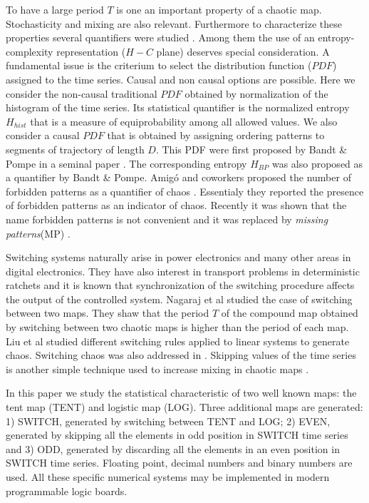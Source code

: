 To have a large period $T$ is one an important property of a chaotic map. Stochasticity and mixing are also relevant. Furthermore to characterize these properties several quantifiers were
studied  \cite{DeMicco2009}. Among them the use of an
entropy-complexity representation ($H-C$ plane) deserves special
consideration\cite{Rosso2007C,DeMicco2008,DeMicco2011,DeMicco2009,Rosso2009}. 
A fundamental issue is the criterium to select the distribution function ($PDF$) assigned to the time series. Causal and non causal options are possible. Here we consider the non-causal traditional $PDF$ obtained by normalization of the histogram of the time series. Its statistical quantifier is the normalized entropy$H_{hist}$ that is  a measure of equiprobability among all allowed values. We also consider a causal $PDF$  that is obtained by assigning ordering patterns to segments of trajectory of length $D$. This PDF were first proposed by Bandt \& Pompe in a seminal paper \cite{Pompe2002}. The corresponding entropy $H_{BP}$ was also proposed as a quantifier by Bandt \& Pompe. Amig\'o and coworkers proposed the number of forbidden patterns as a quantifier of chaos \cite{Amigo2007b}. Essentialy they reported the presence of forbidden patterns as an indicator of chaos. Recently it was shown that the name forbidden patterns is not convenient and it was replaced by  \emph{missing patterns}(MP) \cite{Rosso2012b}. 

Switching systems naturally arise in power electronics and many other areas in digital electronics. They have also interest in transport problems in deterministic ratchets \cite{Zarlenga2009} and it is known that synchronization of the switching procedure affects the output of the controlled system. Nagaraj et al \cite{Nagaraj2008} studied the case of switching between two maps. They shaw that the period $T$ of the
compound map obtained by switching between two chaotic maps is
higher than the period of each map.  Liu et al \cite{Liu2006} studied different switching rules applied to linear systems to generate chaos. Switching chaos was also addressed in \cite{Gluskin2008}.  Skipping values of the time series is another simple technique used to increase mixing in chaotic maps \cite{DeMicco2008}. 

In this paper we study the statistical characteristic of two well known maps: the tent map (TENT) and logistic map (LOG). Three additional maps are generated: 1) SWITCH, generated by switching between TENT and LOG; 2) EVEN, generated by skipping all the elements in odd position in SWITCH time series and 3) ODD, generated by discarding all the elements in an even position in SWITCH time series. Floating point, decimal numbers and binary numbers are used. All these specific numerical systems may be implemented in modern programmable logic boards. 

